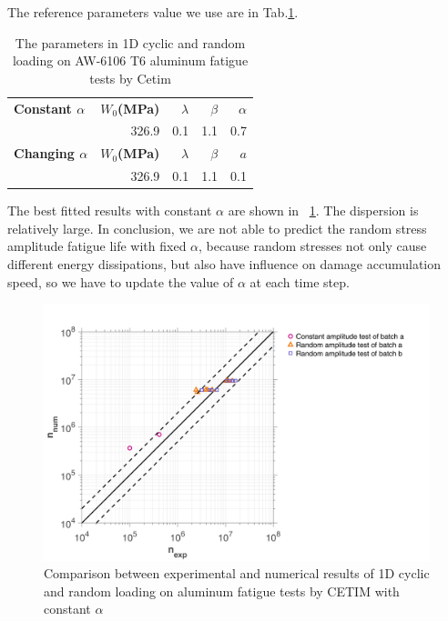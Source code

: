 \documentclass[3p,times,number,review]{elsarticle}
\newcommand{\figref}[1]{\figurename~\ref{#1}}
\begin{document}
The reference parameters value we use are in Tab.\ref{tab.cetim.alp}.  
\begin{table}[!h]
\centering
\begin{tabular}{lrrrr}
\hline
\textbf{Constant $\alpha$} & \textbf{$W_0$(MPa)} & \textbf{$\lambda$} & \textbf{$\beta$}  & \textbf{$\alpha$}\\
& 326.9         & 0.1               & 1.1            & 0.7                         \\ \hline
\textbf{Changing $\alpha$} & \textbf{$W_0$(MPa)} & \textbf{$\lambda$} & \textbf{$\beta$}  & \textbf{$a$}\\
& 326.9         & 0.1               & 1.1            & 0.1                         \\ \hline
\end{tabular}
\caption{The parameters in 1D cyclic and random loading on AW-6106 T6
aluminum fatigue tests by Cetim}
\label{tab.cetim.alp}
\end{table}

The best fitted results with constant $\alpha$ are shown in \figref{fig.Cetimerralpfix}. The dispersion is relatively large. In conclusion, we are not able to predict the random stress amplitude fatigue life with fixed $\alpha$, because random stresses not only cause different energy dissipations, but also have influence on damage accumulation speed, so we have to update the value of $\alpha$ at each time step. 

\begin{figure}[!h]
\centering
\includegraphics[width=\textwidth]{figures//Cetim_err_alpfix.png} 
\caption{Comparison between experimental and numerical results of 1D cyclic and random loading on aluminum fatigue tests by CETIM with constant $\alpha$}
\label{fig.Cetimerralpfix}
\end{figure}
\end{document}
